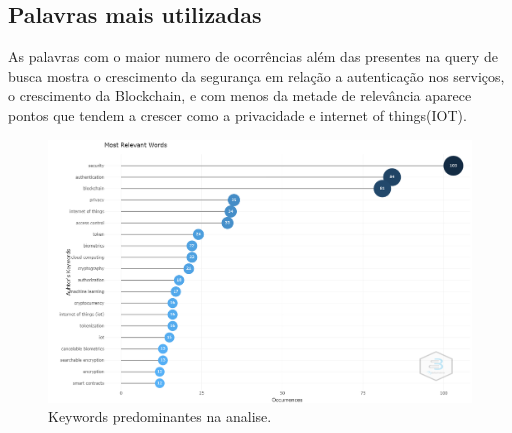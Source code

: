 \subsection{Palavras mais utilizadas}
As palavras com o maior numero de ocorrências além das presentes na query de busca mostra o crescimento da segurança em relação a autenticação nos serviços, o crescimento da Blockchain, e com menos da metade de relevância aparece pontos que tendem a crescer como a privacidade e internet of things(IOT).

\begin{figure}
    \centering
    \includegraphics[width=1\textwidth]{experiments/AllannH/PesquisaBibliometrica/Imagens/TSW-AllannH-palavras_relevantes.png}
    \caption{Keywords predominantes na analise.}
    \label{fig:AllannH-palavras_relevantes}
\end{figure}